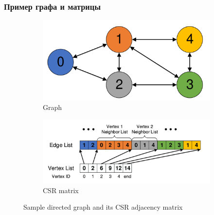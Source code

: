 \documentclass[xcolor=table,english]{beamer}
\begin{document}
\begin{frame}[fragile] \frametitle{Пример графа и матрицы}
    \begin{minipage}[m]{1.0\linewidth}
        \begin{figure}
            \centering
            \begin{subfigure}[b]{0.47\textwidth}
                \includegraphics[width=\textwidth]{figures/graph.png}
                \caption{Graph}
            \end{subfigure}
            \hfill
            \begin{subfigure}[b]{0.47\textwidth}
                \includegraphics[width=\textwidth]{figures/csr_matrix.png}
                \caption{CSR matrix}
            \end{subfigure}
            \caption{Sample directed graph and its CSR adjacency matrix}
        \end{figure}
    \end{minipage}\hfill
\end{frame}
\end{document}

